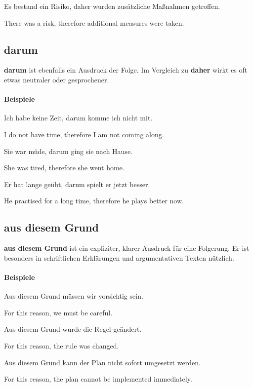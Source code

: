 \documentclass[a4paper]{article}
\newcommand{\EN}[1]{\par{\small\textcolor{TranslationGray}{#1}}\vspace{0.25em}}
\begin{document}
        Es bestand ein Risiko, daher wurden zusätzliche Maßnahmen getroffen.\\
        \EN{There was a risk, therefore additional measures were taken.}
    
    \subsection{darum}
    \textbf{darum} ist ebenfalls ein Ausdruck der Folge. Im Vergleich zu \textbf{daher} wirkt es oft etwas neutraler oder gesprochener.
    
    \paragraph{Beispiele}
        Ich habe keine Zeit, darum komme ich nicht mit.\\
        \EN{I do not have time, therefore I am not coming along.}
        
        Sie war müde, darum ging sie nach Hause.\\
        \EN{She was tired, therefore she went home.}
        
        Er hat lange geübt, darum spielt er jetzt besser.\\
        \EN{He practised for a long time, therefore he plays better now.}
    
    \subsection{aus diesem Grund}
    \textbf{aus diesem Grund} ist ein expliziter, klarer Ausdruck für eine Folgerung. Er ist besonders in schriftlichen Erklärungen und argumentativen Texten nützlich.
    
    \paragraph{Beispiele}
        Aus diesem Grund müssen wir vorsichtig sein.\\
        \EN{For this reason, we must be careful.}
        
        Aus diesem Grund wurde die Regel geändert.\\
        \EN{For this reason, the rule was changed.}
        
        Aus diesem Grund kann der Plan nicht sofort umgesetzt werden.\\
        \EN{For this reason, the plan cannot be implemented immediately.}
    
\end{document}
